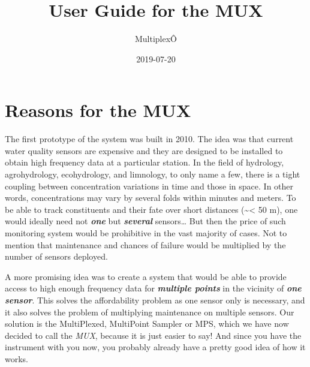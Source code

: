 \documentclass[]{book}
\title{User Guide for the MUX}
\author{MultiplexÔ}
\date{2019-07-20}
\begin{document}
\maketitle

{
\setcounter{tocdepth}{1}
\tableofcontents
}
\hypertarget{reasons-for-the-mux}{%
\chapter{Reasons for the MUX}\label{reasons-for-the-mux}}

The first prototype of the system was built in 2010. The idea was that current water quality sensors are expensive and they are designed to be installed to obtain high frequency data at a particular station. In the field of hydrology, agrohydrology, ecohydrology, and limnology, to only name a few, there is a tight coupling between concentration variations in time and those in space. In other words, concentrations may vary by several folds within minutes and meters. To be able to track constituents and their fate over short distances (\textasciitilde{}\textless{} 50 m), one would ideally need not \emph{\textbf{one}} but \emph{\textbf{several}} sensors\ldots{} But then the price of such monitoring system would be prohibitive in the vast majority of cases. Not to mention that maintenance and chances of failure would be multiplied by the number of sensors deployed.

A more promising idea was to create a system that would be able to provide access to high enough frequency data for \emph{\textbf{multiple points}} in the vicinity of \emph{\textbf{one sensor}}. This solves the affordability problem as one sensor only is necessary, and it also solves the problem of multiplying maintenance on multiple sensors. Our solution is the MultiPlexed, MultiPoint Sampler or MPS, which we have now decided to call the \emph{MUX}, because it is just easier to say! And since you have the instrument with you now, you probably already have a pretty good idea of how it works.
\end{document}
